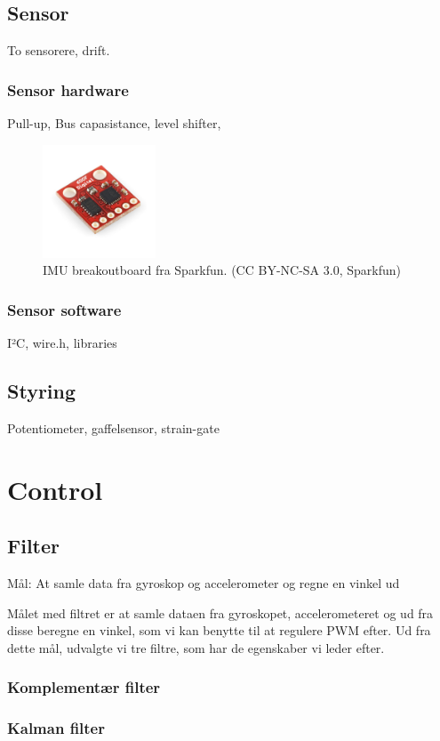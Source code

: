 \documentclass[a4paper,twoside,article,danish,table]{memoir}
\begin{document}
\section{Sensor}
To sensorere, drift.
\subsection{Sensor hardware}
Pull-up, Bus capasistance, level shifter,
\begin{figure}[htbp]
  \centering
  \includegraphics[width=0.3\textwidth]{pictures/imu.jpg}
  \caption[IMU breakoutboard fra Sparkfun]{IMU breakoutboard fra Sparkfun. (CC BY-NC-SA 3.0, Sparkfun)}
  \label{fig:imu}
\end{figure}
\subsection{Sensor software}
I²C, wire.h, libraries

\section{Styring}
Potentiometer, gaffelsensor, strain-gate

\chapter{Control}
\section{Filter}
Mål: At samle data fra gyroskop og accelerometer og regne en vinkel ud

Målet med filtret er at samle dataen fra gyroskopet, accelerometeret og ud fra disse beregne en vinkel, som vi kan benytte til at regulere PWM efter. Ud fra dette mål, udvalgte vi tre filtre, som har de egenskaber vi leder efter.
\subsection{Komplementær filter}
\subsection{Kalman filter}
\end{document}
